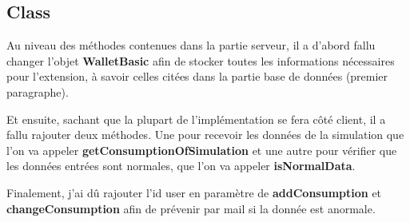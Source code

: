 \subsection{Class}

\begin{flushleft}
Au niveau des méthodes contenues dans la partie serveur, il a d'abord fallu changer l'objet \textbf{WalletBasic} afin de stocker toutes les informations nécessaires pour l'extension, à savoir celles citées dans la partie base de données (premier paragraphe).
\end{flushleft}

\begin{flushleft}
Et ensuite, sachant que la plupart de l'implémentation se fera côté client, il a fallu rajouter deux méthodes. Une pour recevoir les données de la simulation que l'on va appeler \textbf{getConsumptionOfSimulation} et une autre pour vérifier que les données entrées sont normales, que l'on va appeler \textbf{isNormalData}.
\end{flushleft}

\begin{flushleft}
Finalement, j'ai dû rajouter l'id user en paramètre de \textbf{addConsumption} et \textbf{changeConsumption} afin de prévenir par mail si la donnée est anormale.
\end{flushleft}


